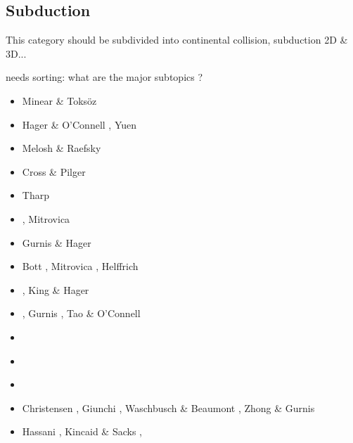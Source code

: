 \subsection{Subduction} 
This category should be subdivided into continental collision, subduction 2D \& 3D...

{\color{red} needs sorting: what are the major subtopics ? } 

\begin{scriptsize}
\begin{itemize}
\item[\nineteenseventy] Minear \& Toks{\"o}z \cite{mito70}
\item[\nineteenseventyeight] Hager \& O'Connell \cite{haoc78}, Yuen \etal \cite{yufs78}
\item[\nineteeneighty] Melosh \& Raefsky \cite{mera80}
\item[\nineteeneightytwo] Cross \& Pilger \cite{crpi82}
\item[\nineteeneightyfive] Tharp \cite{thar85}
\item[\nineteeneightysix] \cite{jarr86}, Mitrovica \etal \cite{mipb96}
\item[\nineteeneightyeight] Gurnis \& Hager \cite{guha88}
\item[\nineteeneightynine] Bott \etal \cite{boww89}, Mitrovica \etal \cite{mibj89},
                           Helffrich \etal \cite{hesw89}
\item[\nineteenninety] \cite{hstt90}, King \& Hager \cite{kiha90}
\item[\nineteenninetytwo] \cite{zhgu92}\cite{whbw92}, 
                          Gurnis \cite{gurn92}, Tao \& O'Connell \cite{taoc92}
\item[\nineteenninetythree] \cite{jope93}\cite{dvnm93}\cite{wibf93}\cite{shem93}
\item[\nineteenninetyfour] \cite{zhgu94}\cite{wibe94}
                           \cite{wdbo94a}\cite{wdbo94b}
                           \cite{bequ94}\cite{gaha94}
\item[\nineteenninetyfive] \cite{masa95}
\item[\nineteenninetysix] Christensen \cite{chri96}, Giunchi \etal \cite{gisb96},
                          Waschbusch \& Beaumont \cite{wabe96}, Zhong \& Gurnis \cite{zhgu96}
\item[\nineteenninetyseven] Hassani \etal \cite{hajc97}, Kincaid \& Sacks \cite{kisa97}, 

\end{itemize}
\end{scriptsize}
